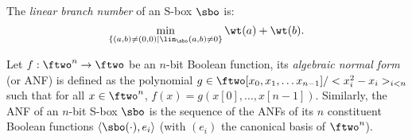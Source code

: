 \begin{defi}
The \emph{linear branch number} of an S-box $\sbo$ is:
\[
\min_{\{(a,b) \neq (0,0) | \lin_{\sbo}(a,b) \neq 0\}} \wt(a) + \wt(b).
\]

\end{defi}

\begin{defi}
Let $f : \ftwo^n \rightarrow \ftwo$ be an $n$-bit Boolean function, its \emph{algebraic normal form}
(or ANF) is defined as the polynomial $g \in \ftwo[x_0,x_1,\ldots x_{n-1}]/<x_i^2-x_i>_{i<n}$
such that for all $x \in \ftwo^n$, $f(x) = g(x[0],\ldots,\allowbreak x[n-1])$.
Similarly, the ANF of an $n$-bit S-box $\sbo$ 
is the sequence of the ANFs of its $n$ constituent Boolean
functions $\langle\sbo(\cdot),e_i\rangle$ (with $(e_i)$ the canonical basis of $\ftwo^n$).
\end{defi}

